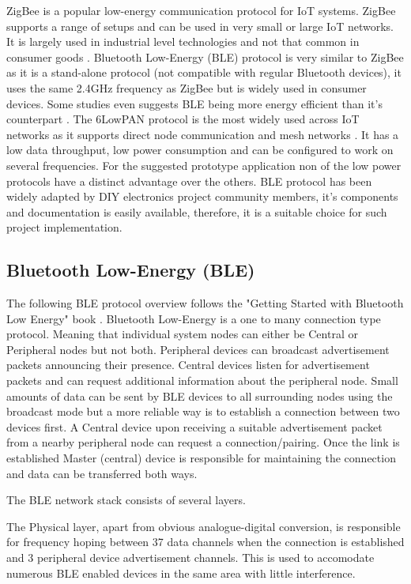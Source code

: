 \documentclass[conference]{IEEEtran}
\begin{document}
ZigBee is a popular low-energy communication protocol for IoT systems. ZigBee supports a range of setups and can be used in very small or large IoT networks. It is largely used in industrial level technologies and not that common in consumer goods \cite{zigbee}. Bluetooth Low-Energy (BLE) protocol is very similar to ZigBee as it is a stand-alone protocol (not compatible with regular Bluetooth devices), it uses the same 2.4GHz frequency as ZigBee but is widely used in consumer devices. Some studies even suggests BLE being more energy efficient than it's counterpart \cite{ble_low}. The 6LowPAN protocol is the most widely used across IoT networks as it supports direct node communication and mesh networks \cite{ee2010review}. It has a low data throughput, low power consumption and can be configured to work on several frequencies. For the suggested prototype application non of the low power protocols have a distinct advantage over the others. BLE protocol has been widely adapted by DIY electronics project community members, it's components and documentation is easily available, therefore, it is a suitable choice for such project implementation.

\subsection{Bluetooth Low-Energy (BLE)}
The following BLE protocol overview follows the "Getting Started with Bluetooth Low Energy" book \cite{ble_book}.
Bluetooth Low-Energy is a one to many connection type protocol. Meaning that individual system nodes can either be Central or Peripheral nodes but not both. Peripheral devices can broadcast advertisement packets announcing their presence. Central devices listen for advertisement packets and can request additional information about the peripheral node. Small amounts of data can be sent by BLE devices to all surrounding nodes using the broadcast mode but a more reliable way is to establish a connection between two devices first. A Central device upon receiving a suitable advertisement packet from a nearby peripheral node can request a connection/pairing. Once the link is established Master (central) device is responsible for maintaining the connection and data can be transferred both ways. 

The BLE network stack consists of several layers.

The Physical layer, apart from obvious analogue-digital conversion, is responsible for frequency hoping between 37 data channels when the connection is established and 3 peripheral device advertisement channels. This is used to accomodate numerous BLE enabled devices in the same area with little interference. 
\end{document}
